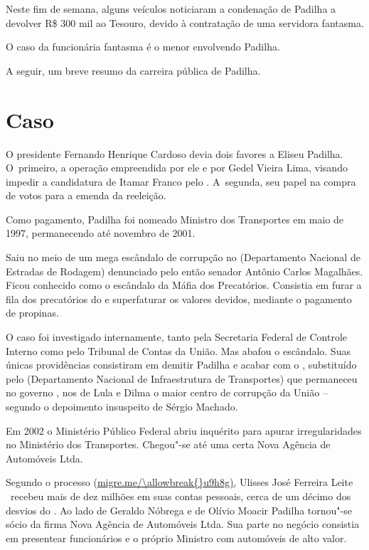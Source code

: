 Neste fim de semana, alguns veículos noticiaram a condenação de Padilha
a devolver R\$ 300 mil ao Tesouro, devido à contratação de uma servidora
fantasma.

O caso da funcionária fantasma é o menor envolvendo Padilha.

A seguir, um breve resumo da carreira pública de Padilha.

\section{Caso }

O presidente Fernando Henrique Cardoso devia dois favores a Eliseu
Padilha. O~primeiro, a operação empreendida por ele e por Gedel Vieira
Lima, visando impedir a candidatura de Itamar Franco pelo . A~segunda, seu papel na compra de votos para a emenda da reeleição.

Como pagamento, Padilha foi nomeado Ministro dos Transportes em maio de
1997, permanecendo até novembro de 2001.

Saiu no meio de um mega escândalo de corrupção no  (Departamento
Nacional de Estradas de Rodagem) denunciado pelo então senador Antônio
Carlos Magalhães. Ficou conhecido como o escândalo da Máfia dos
Precatórios. Consistia em furar a fila dos precatórios do  e
superfaturar os valores devidos, mediante o pagamento de propinas.

O caso foi investigado internamente, tanto pela Secretaria Federal de
Controle Interno como pelo Tribunal de Contas da União. Mas  abafou o
escândalo. Suas únicas providências consistiram em demitir Padilha e
acabar com o , substituído pelo  (Departamento Nacional de
Infraestrutura de Transportes) que permaneceu no governo , nos de
Lula e Dilma o maior centro de corrupção da União -- segundo o
depoimento insuspeito de Sérgio Machado.

Em 2002 o Ministério Público Federal abriu inquérito para apurar
irregularidades no Ministério dos Transportes. Chegou"-se até uma certa
Nova Agência de Automóveis Ltda.

Segundo o processo (\url{migre.me/\allowbreak{}u9h8g)}, Ulisses José Ferreira
Leite ~recebeu mais de dez milhões em suas contas pessoais, cerca de um
décimo dos desvios do . Ao lado de Geraldo Nóbrega e de Olívio
Moacir Padilha tornou"-se sócio da firma Nova Agência de Automóveis Ltda.
Sua parte no negócio consistia em presentear funcionários e o próprio
Ministro com automóveis de alto valor.

